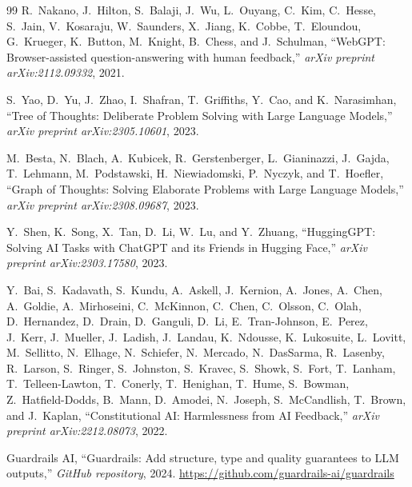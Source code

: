 \documentclass[11pt,a4paper]{article}
\begin{document}
\begin{thebibliography}{99}
R.~Nakano, J.~Hilton, S.~Balaji, J.~Wu, L.~Ouyang, C.~Kim, C.~Hesse,
S.~Jain, V.~Kosaraju, W.~Saunders, X.~Jiang, K.~Cobbe, T.~Eloundou,
G.~Krueger, K.~Button, M.~Knight, B.~Chess, and J.~Schulman,
``WebGPT: Browser-assisted question-answering with human feedback,''
\emph{arXiv preprint arXiv:2112.09332}, 2021.

S.~Yao, D.~Yu, J.~Zhao, I.~Shafran, T.~Griffiths, Y.~Cao, and K.~Narasimhan,
``Tree of Thoughts: Deliberate Problem Solving with Large Language Models,''
\emph{arXiv preprint arXiv:2305.10601}, 2023.

M.~Besta, N.~Blach, A.~Kubicek, R.~Gerstenberger, L.~Gianinazzi, J.~Gajda,
T.~Lehmann, M.~Podstawski, H.~Niewiadomski, P.~Nyczyk, and T.~Hoefler,
``Graph of Thoughts: Solving Elaborate Problems with Large Language Models,''
\emph{arXiv preprint arXiv:2308.09687}, 2023.

Y.~Shen, K.~Song, X.~Tan, D.~Li, W.~Lu, and Y.~Zhuang,
``HuggingGPT: Solving AI Tasks with ChatGPT and its Friends in Hugging Face,''
\emph{arXiv preprint arXiv:2303.17580}, 2023.

Y.~Bai, S.~Kadavath, S.~Kundu, A.~Askell, J.~Kernion, A.~Jones, A.~Chen,
A.~Goldie, A.~Mirhoseini, C.~McKinnon, C.~Chen, C.~Olsson, C.~Olah,
D.~Hernandez, D.~Drain, D.~Ganguli, D.~Li, E.~Tran-Johnson, E.~Perez,
J.~Kerr, J.~Mueller, J.~Ladish, J.~Landau, K.~Ndousse, K.~Lukosuite,
L.~Lovitt, M.~Sellitto, N.~Elhage, N.~Schiefer, N.~Mercado, N.~DasSarma,
R.~Lasenby, R.~Larson, S.~Ringer, S.~Johnston, S.~Kravec, S.~Showk,
S.~Fort, T.~Lanham, T.~Telleen-Lawton, T.~Conerly, T.~Henighan,
T.~Hume, S.~Bowman, Z.~Hatfield-Dodds, B.~Mann, D.~Amodei, N.~Joseph,
S.~McCandlish, T.~Brown, and J.~Kaplan,
``Constitutional AI: Harmlessness from AI Feedback,''
\emph{arXiv preprint arXiv:2212.08073}, 2022.

Guardrails AI, ``Guardrails: Add structure, type and quality guarantees to
LLM outputs,'' \emph{GitHub repository}, 2024.
\url{https://github.com/guardrails-ai/guardrails}

\end{thebibliography}
\end{document}
